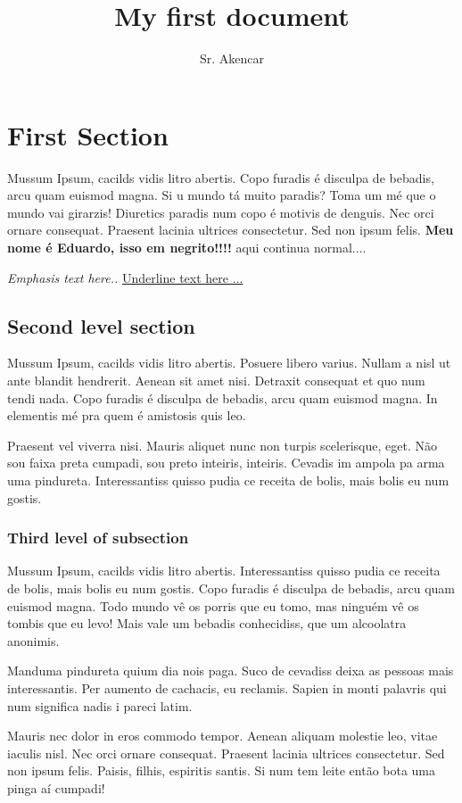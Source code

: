 \documentclass{article}
\title{My first document}
\author{Sr. Akencar}
\date{}
\begin{document}
\maketitle

\section{First Section}

Mussum Ipsum, cacilds vidis litro abertis. Copo furadis é disculpa de bebadis, arcu quam euismod magna. Si u mundo tá muito paradis? Toma um mé que o mundo vai girarzis! Diuretics paradis num copo é motivis de denguis. Nec orci ornare consequat. Praesent lacinia ultrices consectetur. Sed non ipsum felis. \textbf{Meu nome é Eduardo, isso em negrito!!!!} aqui continua normal....

\emph{Emphasis text here..} \underline {Underline text here ...}


\subsection{Second level section}

Mussum Ipsum, cacilds vidis litro abertis. Posuere libero varius. Nullam a nisl ut ante blandit hendrerit. Aenean sit amet nisi. Detraxit consequat et quo num tendi nada. Copo furadis é disculpa de bebadis, arcu quam euismod magna. In elementis mé pra quem é amistosis quis leo.

Praesent vel viverra nisi. Mauris aliquet nunc non turpis scelerisque, eget. Não sou faixa preta cumpadi, sou preto inteiris, inteiris. Cevadis im ampola pa arma uma pindureta. Interessantiss quisso pudia ce receita de bolis, mais bolis eu num gostis.

\subsubsection{Third level of subsection}

Mussum Ipsum, cacilds vidis litro abertis. Interessantiss quisso pudia ce receita de bolis, mais bolis eu num gostis. Copo furadis é disculpa de bebadis, arcu quam euismod magna. Todo mundo vê os porris que eu tomo, mas ninguém vê os tombis que eu levo! Mais vale um bebadis conhecidiss, que um alcoolatra anonimis.

Manduma pindureta quium dia nois paga. Suco de cevadiss deixa as pessoas mais interessantis. Per aumento de cachacis, eu reclamis. Sapien in monti palavris qui num significa nadis i pareci latim.

Mauris nec dolor in eros commodo tempor. Aenean aliquam molestie leo, vitae iaculis nisl. Nec orci ornare consequat. Praesent lacinia ultrices consectetur. Sed non ipsum felis. Paisis, filhis, espiritis santis. Si num tem leite então bota uma pinga aí cumpadi!
\end{document}
